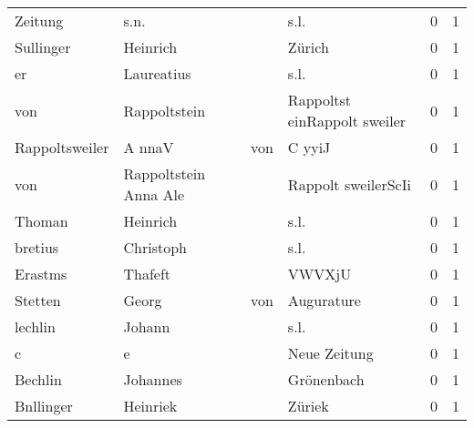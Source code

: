 \begin{tabular}{llllrr}
                  Zeitung &                               s.n. &             &                                        s.l. &          0 &         1 \\
                Sullinger &                           Heinrich &             &                                      Zürich &          0 &         1 \\
                       er &                         Laureatius &             &                                        s.l. &          0 &         1 \\
                      von &                       Rappoltstein &             &                Rappoltst einRappolt sweiler &          0 &         1 \\
           Rappoltsweiler &                             A nnaV &         von &                                      C yyiJ &          0 &         1 \\
                      von &              Rappoltstein Anna Ale &             &                         Rappolt sweilerScIi &          0 &         1 \\
                   Thoman &                           Heinrich &             &                                        s.l. &          0 &         1 \\
                  bretius &                          Christoph &             &                                        s.l. &          0 &         1 \\
                  Erastms &                            Thafeft &             &                                      VWVXjU &          0 &         1 \\
                  Stetten &                              Georg &         von &                                  Augurature &          0 &         1 \\
                  lechlin &                             Johann &             &                                        s.l. &          0 &         1 \\
                        c &                                  e &             &                                Neue Zeitung &          0 &         1 \\
                  Bechlin &                           Johannes &             &                                  Grönenbach &          0 &         1 \\
                Bnllinger &                           Heinriek &             &                                      Züriek &          0 &         1 \\

\end{tabular}
